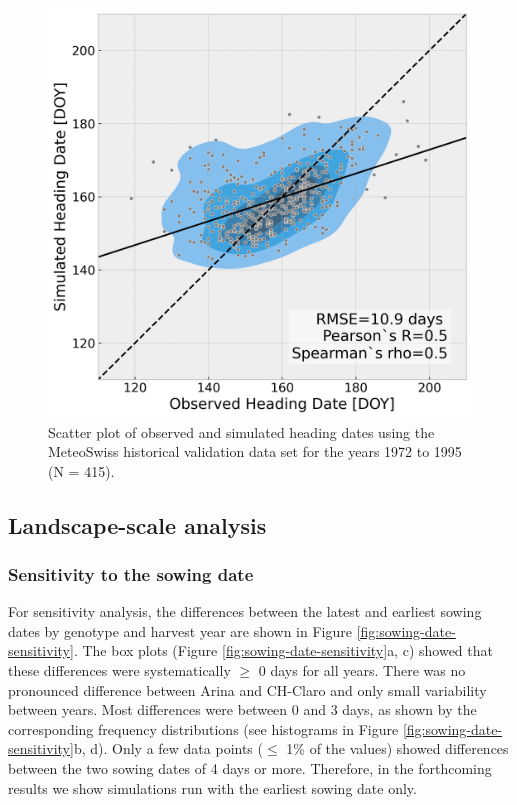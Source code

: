 \begin{figure}[H]
    \centering
    \includegraphics[scale=0.5]{03-Heading-Dates/img/scatter_plot_validation_meteoswiss.png}
    \caption{Scatter plot of observed and simulated heading dates using the MeteoSwiss historical validation data set for the years 1972 to 1995 (N = 415).}
    \label{fig:val-scatter-meteoswiss}
\end{figure}

\subsection{Landscape-scale analysis}

\subsubsection{Sensitivity to the sowing date}
\label{subsubsec:sensitivity}

For sensitivity analysis, the differences between the latest and earliest sowing dates by genotype and harvest year are shown in Figure \ref{fig:sowing-date-sensitivity}. The box plots (Figure \ref{fig:sowing-date-sensitivity}a, c) showed that these differences were systematically $\ge$ 0 days for all years. There was no pronounced difference between Arina and CH-Claro and only small variability between years. Most differences were between 0 and 3 days, as shown by the corresponding frequency distributions (see histograms in Figure \ref{fig:sowing-date-sensitivity}b, d). Only a few data points ($\le$ 1\% of the values) showed differences between the two sowing dates of 4 days or more. Therefore, in the forthcoming results we show simulations run with the earliest sowing date only.


